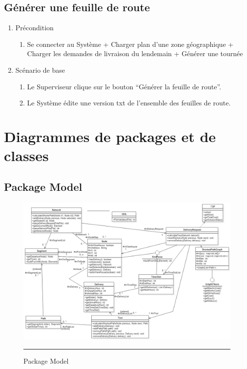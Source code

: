 \subsection{Générer une feuille de route}

\begin{enumerate}
\item Précondition
\begin{enumerate}
\item Se connecter au Système + Charger plan d’une zone géographique + Charger les demandes de livraison du lendemain + Générer une tournée

\end{enumerate}


\item Scénario de base 
\begin{enumerate}
\item Le Superviseur clique sur le bouton “Générer la feuille de route”.
\item Le Système édite une version txt de l’ensemble des feuilles de route. 
\end{enumerate}
\end{enumerate}




\clearpage
\section{Diagrammes de packages et de classes}
\subsection{Package Model}
\begin{figure}[H]
\centering
	\centering
		\includegraphics[width=\textwidth,height=\textheight,keepaspectratio, angle=90]{Figures/modele}
		\rule{35em}{0.5pt}
	\caption[Model]{Package Model}
\end{figure}
\clearpage
